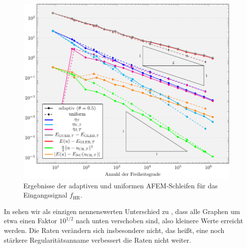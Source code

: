 \begin{figure}[p]
  \centering
  \includegraphics[width=\linewidth]
    {pictures/chapExperiments/secExactSol/f04/conv.pdf}
  \caption{Ergebnisse der adaptiven und uniformen AFEM-Schleifen für das 
  Eingangssignal $f_\textrm{HR}$.}
  \label{fig:f04Convergence}
\end{figure}
In  sehen wir als einzigen nennenswerten Unterschied
zu , dass alle Graphen um etwa einen Faktor $10^{1/2}$
nach unten verschoben sind, also kleinere Werte erreicht werden.
Die Raten verändern sich insbesondere nicht, das heißt, eine noch stärkere
Regularitätsanname verbessert die Raten nicht weiter.

